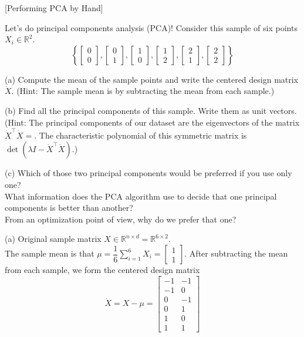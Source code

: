 \item {} [Performing PCA by Hand]

Let's do principal components analysis (PCA)! Consider this sample of six points $X_i \in \mathbb{R}^2$.
$$\left\{
\left[\begin{array}{l} 0 \\ 0 \end{array}\right],
\left[\begin{array}{l} 0 \\ 1 \end{array}\right],
\left[\begin{array}{l} 1 \\ 0 \end{array}\right],
\left[\begin{array}{l} 1 \\ 2 \end{array}\right],
\left[\begin{array}{l} 2 \\ 1 \end{array}\right],
\left[\begin{array}{l} 2 \\ 2 \end{array}\right]\right\}$$

(a) Compute the mean of the sample points and write the centered design matrix $\dot{X}$. 
(Hint: The sample mean is by subtracting the mean from each sample.)

(b) Find all the principal components of this sample. Write them as unit vectors. 
(Hint: The principal components of our dataset are the eigenvectors of the matrix $\dot{X}^{\top} \dot{X}=
$. The characteristic polynomial of this symmetric matrix is $\det\left(\lambda I-\dot{X}^{\top} \dot{X}\right)$.)

(c) Which of those two principal components would be preferred if you use only one?  \\
What information does the PCA algorithm use to decide that one principal components is better than another?  \\
From an optimization point of view, why do we prefer that one? 

\solution

(a) Original sample matrix $X\in \mathbb{R}^{n\times d}=\mathbb{R}^{6\times 2}$. \\
The sample mean is that $\mu=\dfrac{1}{6}\sum\limits_{i=1}^6 X_i=\left[\begin{array}{l} 1 \\ 1 \end{array}\right]$. After subtracting the mean from each sample, we form the centered design matrix
$$\dot{X}=X-\mu=\begin{bmatrix}
-1 & -1 \\
-1 & 0 \\
0 & -1 \\
0 & 1 \\
1 & 0 \\
1 & 1
\end{bmatrix}$$

